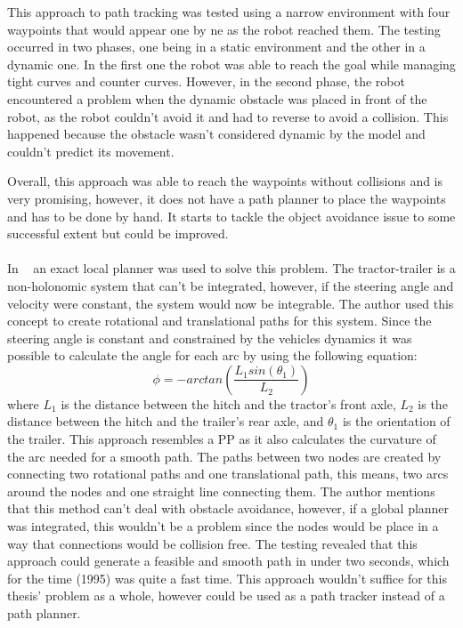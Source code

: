 This approach to path tracking was tested using a narrow environment with four waypoints that would 
appear one by ne as the robot reached them. The testing occurred in two phases, one being in a static 
environment and the other in a dynamic one. In the first one the robot was able to reach the 
goal while managing tight curves and counter curves. However, in the second phase, the robot 
encountered a problem when the dynamic obstacle was placed in front of the robot, as the robot couldn't 
avoid it and had to reverse to avoid a collision. This happened because the obstacle wasn't considered 
dynamic by the model and couldn't predict its movement.

Overall, this approach was able to reach the waypoints without collisions and is very promising, however, 
it does not have a path planner to place the waypoints and has to be done by hand. It starts to 
tackle the object avoidance issue to some successful extent but could be improved.

\paragraph{} In ~\cite{ttex3} an exact local planner was used to solve this problem. The tractor-trailer is a 
non-holonomic system that can't be integrated, however, if the steering angle and velocity were constant, 
the system would now be integrable. The author used this concept to create rotational and translational 
paths for this system. Since the steering angle is constant and constrained by the vehicles dynamics 
it was possible to calculate the angle for each arc by using the following equation:
\begin{equation}
    \phi = -arctan(\frac{L_1sin(\theta_1)}{L_2})
\end{equation}
where $L_1$ is the distance between the hitch and the tractor's front axle, $L_2$ is the distance between the 
hitch and the trailer's rear axle, and $\theta_1$ is the orientation of the trailer. This approach 
resembles a \gls{PP} as it also calculates the curvature of the arc needed for a smooth 
path. The paths between two nodes are created by connecting two rotational paths and one translational path, this means, two arcs around 
the nodes and one straight line connecting them. The author mentions that this method can't deal 
with obstacle avoidance, however, if a global planner was integrated, this wouldn't be 
a problem since the nodes would be place in a way that connections would be collision free. 
The testing revealed that this approach could generate a feasible and smooth path in under two seconds, 
which for the time (1995) was quite a fast time. This approach wouldn't suffice for this thesis' 
problem as a whole, however could be used as a path tracker instead of a path planner.

